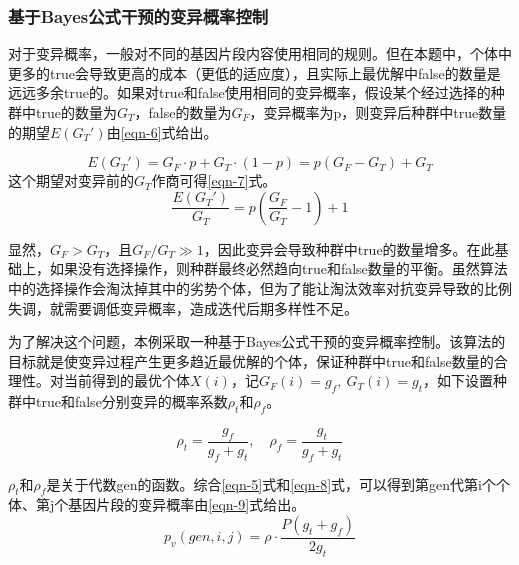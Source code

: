 \documentclass[withoutpreface,bwprint]{cumcmthesis} %
\begin{document}
\subsubsection{基于Bayes公式干预的变异概率控制}
\label{sec:bayes}

对于变异概率，一般对不同的基因片段内容使用相同的规则。但在本题中，个体中更多的true会导致更高的成本（更低的适应度），且实际上最优解中false的数量是远远多余true的。如果对true和false使用相同的变异概率，假设某个经过选择的种群中true的数量为$G_T$，false的数量为$G_F$，变异概率为p，则变异后种群中true数量的期望$E(G_T')$由\ref{eqn-6}式给出。

\begin{equation}\label{eqn-6}
    E(G_T')=G_F\cdot p+G_T\cdot (1-p)=p(G_F-G_T)+G_T
\end{equation}
这个期望对变异前的$G_T$作商可得\ref{eqn-7}式。
\begin{equation}\label{eqn-7}
    \frac{E(G_T')}{G_T}=p(\frac{G_F}{G_T}-1)+1
\end{equation}

显然，$G_F>G_T$，且$G_F/G_T\gg 1$，因此变异会导致种群中true的数量增多。在此基础上，如果没有选择操作，则种群最终必然趋向true和false数量的平衡。虽然算法中的选择操作会淘汰掉其中的劣势个体，但为了能让淘汰效率对抗变异导致的比例失调，就需要调低变异概率，造成迭代后期多样性不足。

为了解决这个问题，本例采取一种基于Bayes公式干预的变异概率控制。该算法的目标就是使变异过程产生更多趋近最优解的个体，保证种群中true和false数量的合理性。对当前得到的最优个体$X(i)$，记$G_F(i)=g_f,\ G_T(i)=g_t$，如下设置种群中true和false分别变异的概率系数$\rho _t$和$\rho _f$。

\begin{equation}\label{eqn-8}
    \rho_t=\frac{g_f}{g_f+g_t},\quad
    \rho_f=\frac{g_t}{g_f+g_t}
\end{equation}

$\rho_t$和$\rho_f$是关于代数gen的函数。综合\ref{eqn-5}式和\ref{eqn-8}式，可以得到第gen代第i个个体、第j个基因片段的变异概率由\ref{eqn-9}式给出。
\begin{equation}\label{eqn-9}
    p_v(gen,i,j)=\rho \cdot \frac{P(g_t+g_f)}{2g_t}
\end{equation}
\end{document}
